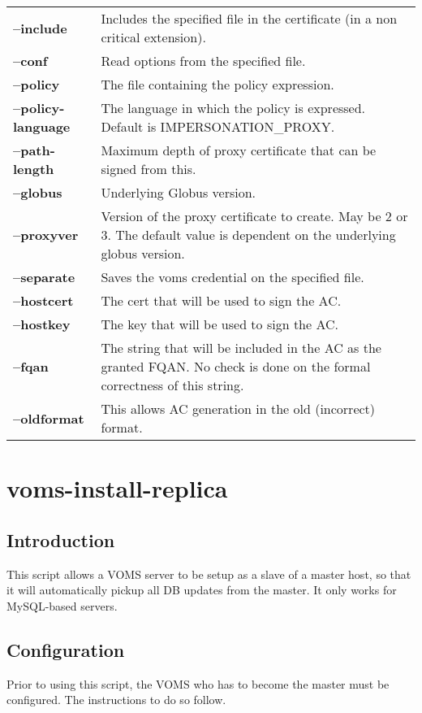\documentclass[a4paper]{book}
\begin{document}
\begin{longtable}{lp{3in}}
\textbf{--include}      & Includes the specified file in the
                          certificate (in a non critical extension).\\
\textbf{--conf}         & Read options from the specified file.\\
\textbf{--policy}       & The file containing the policy expression.\\
\textbf{--policy-language} & The language in which the policy is
                             expressed.  Default is
                             IMPERSONATION\_PROXY.\\
\textbf{--path-length}  & Maximum depth of proxy certificate that can
                          be signed from this.\\
\textbf{--globus}       & Underlying Globus version.\\
\textbf{--proxyver}     & Version of the proxy certificate to create.
                          May be 2 or 3.  The default value is
                          dependent on the underlying globus version.\\
\textbf{--separate}     & Saves the voms credential on the specified
                          file.\\ 
\textbf{--hostcert}     & The cert that will be used to sign the AC.\\
\textbf{--hostkey}      & The key that will be used to sign the AC.\\
\textbf{--fqan}         & The string that will be included in the AC
                          as the granted FQAN.  No check is done on
                          the formal correctness of this string.\\
\textbf{--oldformat}    & This allows AC generation in the old (incorrect) format.\\
\end{longtable}

\chapter{voms-install-replica}
\section{Introduction}
This script allows a VOMS server to be setup as a slave of a master
host, so that it will automatically pickup all DB updates from the
master.  It only works for MySQL-based servers.

\section{Configuration}
Prior to using this script, the VOMS who has to become the master must
be configured.  The instructions to do so follow.
\end{document}
